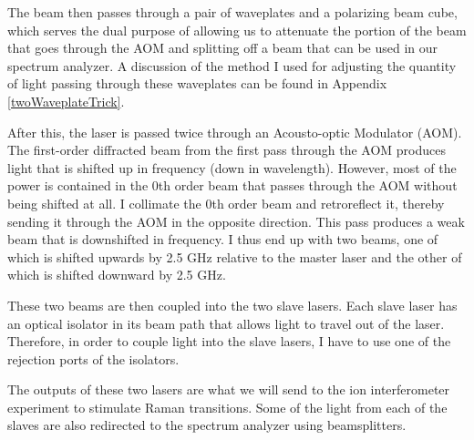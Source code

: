 The beam then passes through a pair of waveplates and a polarizing beam cube, which serves the dual purpose of allowing us to attenuate the portion of the beam that goes through the AOM and splitting off a beam that can be used in our spectrum analyzer. A discussion of the method I used for adjusting the quantity of light passing through these waveplates can be found in Appendix \ref{twoWaveplateTrick}.

After this, the laser is passed twice through an Acousto-optic Modulator (AOM). The first-order diffracted beam from the first pass through the AOM produces light that is shifted up in frequency (down in wavelength). However, most of the power is contained in the 0th order beam that passes through the AOM without being shifted at all. I collimate the 0th order beam and retroreflect it, thereby sending it through the AOM in the opposite direction. This pass produces a weak beam that is downshifted in frequency. I thus end up with two beams, one of which is shifted upwards by 2.5 GHz relative to the master laser and the other of which is shifted downward by 2.5 GHz. 

These two beams are then coupled into the two slave lasers. Each slave laser has an optical isolator in its beam path that allows light to travel out of the laser. Therefore, in order to couple light into the slave lasers, I have to use one of the rejection ports of the isolators.

The outputs of these two lasers are what we will send to the ion interferometer experiment to stimulate Raman transitions. Some of the light from each of the slaves are also redirected to the spectrum analyzer using beamsplitters.


